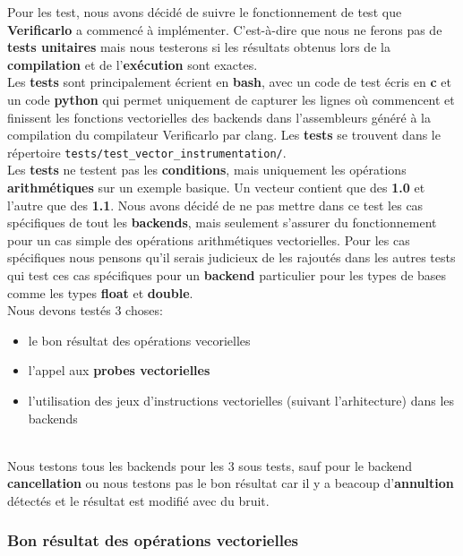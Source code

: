 \documentclass[11pt]{article}
\begin{document}
Pour les test, nous avons décidé de suivre le fonctionnement de
test que \textbf{Verificarlo} a commencé à implémenter. C'est-à-dire que
nous ne ferons pas de \textbf{tests unitaires} mais nous testerons si les
résultats obtenus lors de la \textbf{compilation} et de l'\textbf{exécution} sont
exactes.
\\ \vspace{5mm}
Les \textbf{tests} sont principalement écrient en \textbf{bash}, avec un code de
test écris en \textbf{c} et un code \textbf{python} qui permet uniquement de
capturer les lignes où commencent et finissent les fonctions
vectorielles des backends dans l'assembleurs généré à la
compilation du compilateur Verificarlo par clang. Les \textbf{tests} se
trouvent dans le répertoire \texttt{tests/test\_vector\_instrumentation/}.
\\ \vspace{5mm}
Les \textbf{tests} ne testent pas les \textbf{conditions}, mais uniquement les
opérations \textbf{arithmétiques} sur un exemple basique. Un vecteur contient que
des \textbf{1.0} et l'autre que des \textbf{1.1}. Nous avons décidé de ne pas mettre dans
ce test les cas spécifiques de tout les \textbf{backends}, mais seulement s'assurer
du fonctionnement pour un cas simple des opérations arithmétiques
vectorielles. Pour les cas spécifiques nous pensons qu'il serais judicieux de
les rajoutés dans les autres tests qui test ces cas spécifiques pour un
\textbf{backend} particulier pour les types de bases comme les types \textbf{float} et
\textbf{double}.
\\ \vspace{5mm}
Nous devons testés 3 choses:
\begin{itemize}
\item le bon résultat des opérations vecorielles
\item l'appel aux \textbf{probes vectorielles}
\item l'utilisation des jeux d'instructions vectorielles (suivant
l'arhitecture) dans les backends
\end{itemize}
\\ \vspace{5mm}
Nous testons tous les backends pour les 3 sous tests, sauf pour le backend
\textbf{cancellation} ou nous testons pas le bon résultat car il y a beacoup
d'\textbf{annultion} détectés et le résultat est modifié avec du bruit.

\subsubsection{Bon résultat des opérations vectorielles}
\label{sec:org9d6cd5f}
\end{document}

